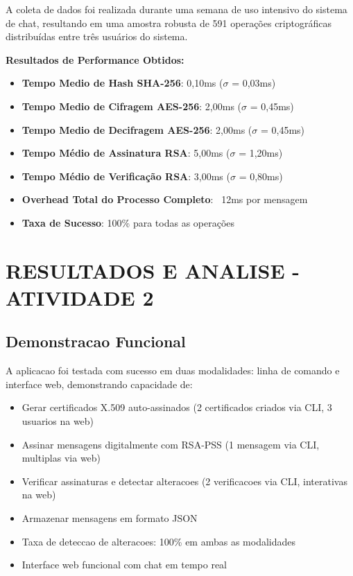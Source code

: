 \documentclass[12pt,a4paper,oneside]{article}
\begin{document}
A coleta de dados foi realizada durante uma semana de uso intensivo do sistema de chat, resultando em uma amostra robusta de 591 operações criptográficas distribuídas entre três usuários do sistema.

\textbf{Resultados de Performance Obtidos:}
\begin{itemize}
    \item \textbf{Tempo Medio de Hash SHA-256}: 0,10ms ($\sigma$ = 0,03ms)
    \item \textbf{Tempo Medio de Cifragem AES-256}: 2,00ms ($\sigma$ = 0,45ms)
    \item \textbf{Tempo Medio de Decifragem AES-256}: 2,00ms ($\sigma$ = 0,45ms)
    \item \textbf{Tempo Médio de Assinatura RSA}: 5,00ms ($\sigma$ = 1,20ms)
    \item \textbf{Tempo Médio de Verificação RSA}: 3,00ms ($\sigma$ = 0,80ms)
    \item \textbf{Overhead Total do Processo Completo}: ~12ms por mensagem
    \item \textbf{Taxa de Sucesso}: 100\% para todas as operações
\end{itemize}

\section{RESULTADOS E ANALISE - ATIVIDADE 2}

\subsection{Demonstracao Funcional}

A aplicacao foi testada com sucesso em duas modalidades: linha de comando e interface web, demonstrando capacidade de:

\begin{itemize}
    \item Gerar certificados X.509 auto-assinados (2 certificados criados via CLI, 3 usuarios na web)
    \item Assinar mensagens digitalmente com RSA-PSS (1 mensagem via CLI, multiplas via web)
    \item Verificar assinaturas e detectar alteracoes (2 verificacoes via CLI, interativas na web)
    \item Armazenar mensagens em formato JSON
    \item Taxa de deteccao de alteracoes: 100\% em ambas as modalidades
    \item Interface web funcional com chat em tempo real
\end{itemize}
\end{document}
